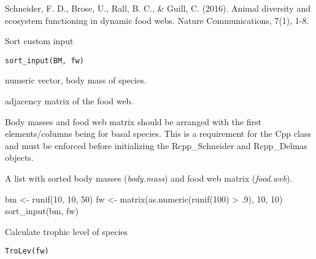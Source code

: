 \documentclass[letterpaper]{book}
\begin{document}
\begin{Format}
\begin{description}
\end{description}

\end{Format}
%
\begin{References}\relax
Schneider, F. D., Brose, U., Rall, B. C., \& Guill, C. (2016).
Animal diversity and ecosystem functioning in dynamic food webs. Nature
Communications, 7(1), 1-8.
\end{References}
%
\begin{Description}\relax
Sort custom input
\end{Description}
%
\begin{Usage}
\begin{verbatim}
sort_input(BM, fw)
\end{verbatim}
\end{Usage}
%
\begin{Arguments}
\begin{ldescription}
\item[\code{BM}] numeric vector, body mass of species.

\item[\code{fw}] adjacency matrix of the food web.
\end{ldescription}
\end{Arguments}
%
\begin{Details}\relax
Body masses and food web matrix should be arranged with the first
elements/columns being for basal species. This is a requirement for the Cpp
class and must be enforced before initializing the Rcpp\_Schneider and
Rcpp\_Delmas objects.
\end{Details}
%
\begin{Value}
A list with sorted body masses (\emph{body.mass}) and food web
matrix (\emph{food.web}).
\end{Value}
%
\begin{Examples}
\begin{ExampleCode}
bm <- runif(10, 10, 50)
fw <- matrix(as.numeric(runif(100) > .9), 10, 10)
sort_input(bm, fw)
\end{ExampleCode}
\end{Examples}
%
\begin{Description}\relax
Calculate trophic level of species
\end{Description}
%
\begin{Usage}
\begin{verbatim}
TroLev(fw)
\end{verbatim}
\end{Usage}
\end{document}
